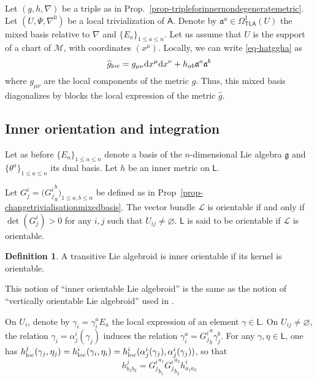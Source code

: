 \documentclass[number]{elsarticle}
\theoremstyle{definition}
\newtheorem{definition}[theorem]{Definition}
\theoremstyle{remark}
\numberwithin{equation}{section}
\begin{document}
Let $(g,h,\nabla)$ be a triple as in Prop.~\ref{prop-tripleforinnernondegeneratemetric}. Let $(U, \Psi, \nabla^{0})$ be a local trivialization of ${{{{\mathbf{\mathsf{{A}}}}}}}$. Denote by ${\mathfrak{a}}^a \in \Omega^1_{{{{\mathbf{\mathsf{{TLA}}}}}}}(U)$ the mixed basis relative to $\nabla$ and $\{E_a\}_{1 \leq a \leq n}$. Let us assume that $U$ is the support of a chart of ${{{{\mathcal{{M}}}}}}$, with coordinates $(x^\mu)$. 
Locally, we can write \eqref{eq-hatggha} as
\begin{equation*}
{{\widehat{g}}}_{{\text{\textup{loc}}}} = g_{\mu \nu} {\text{\textup{d}}} x^\mu {\text{\textup{d}}} x^\nu + h_{a b} {\mathfrak{a}}^a {\mathfrak{a}}^b
\end{equation*}
where $g_{\mu \nu}$ are the local components of the metric $g$. Thus, this mixed basis diagonalizes by blocks the local expression of the metric ${{\widehat{g}}}$.

\subsection{Inner orientation and integration}
\label{subsec-innerorientationandintegration}

Let as before $\{E_a\}_{1 \leq a \leq n}$ denote a basis of the $n$-dimensional Lie algebra ${{\mathfrak g}}$ and $\{\theta^a\}_{1 \leq a \leq n}$ its dual basis. Let $h$ be an inner metric on ${{{{\mathbf{\mathsf{{L}}}}}}}$.

Let $G^{i}_{j}= \big({G^{i}_{j}}^b_a \big)_{1 \leq a,b \leq n}$ be defined as in Prop~\ref{prop-changetrivialisationmixedbasis}. The vector bundle ${{{{\mathcal{{L}}}}}}$ is orientable if and only if $\det({G^{i}_{j}}) > 0$ for any $i,j$ such that $U_{ij} \neq {{\varnothing}}$. ${{{{\mathbf{\mathsf{{L}}}}}}}$ is said to be orientable if ${{{{\mathcal{{L}}}}}}$ is orientable.

\begin{definition}
A transitive Lie algebroid is inner orientable if its kernel is orientable.
\end{definition}

This notion of ``inner orientable Lie algebroid'' is the same as the notion of ``vertically orientable Lie algebroid'' used in \cite{MR1908998}.

On $U_i$, denote by $\gamma_i = \gamma_i^a E_a$ the local expression of an element $\gamma \in {{{{\mathbf{\mathsf{{L}}}}}}}$. On $U_{ij} \neq {{\varnothing}}$, the relation $\gamma_i = \alpha^{i}_{j}(\gamma_j)$ induces the relation $\gamma_i^a = {G^{i}_{j}}^{a}_{b} \gamma_j^b$. For any $\gamma, \eta \in {{{{\mathbf{\mathsf{{L}}}}}}}$, one has $h^j_{{\text{\textup{loc}}}}(\gamma_j, \eta_j) = h^i_{{\text{\textup{loc}}}}(\gamma_i, \eta_i) = h^i_{{\text{\textup{loc}}}}(\alpha^{i}_{j}(\gamma_j), \alpha^{i}_{j}(\gamma_j))$, so that
\begin{equation}
\label{eq-relationtrivh}
h^j_{{b_1} {b_2}} = {G^{i}_{j}}^{a_1}_{b_1} {G^{i}_{j}}^{a_2}_{b_2} h^i_{{a_1} {a_2}}
\end{equation}
\end{document}
